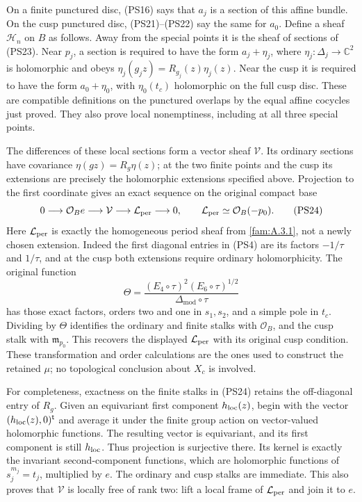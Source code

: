 On a finite punctured disc, (PS16) says that $a_j$ is a section of
this affine bundle. On the cusp punctured disc, (PS21)--(PS22) say
the same for $a_0$. Define a sheaf $\mathscr H_n$ on $B$ as follows.
Away from the special points it is the sheaf of sections of (PS23).
Near $p_j$, a section is required to have the form $a_j+\eta_j$,
where $\eta_j:\Delta_j\to\mathbb C^2$ is holomorphic and obeys
$\eta_j(g_jz)=R_{g_j}(z)\eta_j(z)$. Near the cusp it is required
to have the form $a_0+\eta_0$, with $\eta_0(t_c)$ holomorphic on
the full cusp disc. These are compatible definitions on the punctured
overlaps by the equal affine cocycles just proved. They also prove
local nonemptiness, including at all three special points.

The differences of these local sections form a vector sheaf
$\mathcal V$. Its ordinary sections have covariance $\eta(gz)=R_g\eta(z)$;
at the two finite points and the cusp its extensions are precisely
the holomorphic extensions specified above. Projection to the first
coordinate gives an exact sequence on the original compact base
\[
 0\longrightarrow\mathcal O_B e\longrightarrow\mathcal V
        \longrightarrow\mathcal L_{\rm per}\longrightarrow0,
                  \qquad \mathcal L_{\rm per}\simeq\mathcal O_B(-p_0).
 \tag{PS24}\label{pshift:eq:vector-sheaf}
\]
Here $\mathcal L_{\rm per}$ is exactly the homogeneous period sheaf from
\cref{fam:A.3.1}, not a newly chosen extension. Indeed
the first diagonal entries in (PS4) are its factors $-1/\tau$ and
$1/\tau$, and at the cusp both extensions require ordinary
holomorphicity. The original function
\[
 \Theta=\frac{(E_4\circ\tau)^2(E_6\circ\tau)^{1/2}}
                 {\Delta_{\mathrm{mod}}\circ\tau}
\]
has those exact factors, orders two and one in $s_1,s_2$, and a
simple pole in $t_c$. Dividing by $\Theta$ identifies the ordinary
and finite stalks with $\mathcal O_B$, and the cusp stalk with
$\mathfrak m_{p_0}$. This recovers the displayed $\mathcal L_{\rm per}$
with its original cusp condition. These transformation and order
calculations are the ones used to construct the retained $\mu$;
no topological conclusion about $X_c$ is involved.

For completeness, exactness on the finite stalks in (PS24) retains
the off-diagonal entry of $R_g$. Given an equivariant first component
$h_{\rm loc}(z)$, begin with the vector $(h_{\rm loc}(z),0)^{\mathsf t}$ and average it
under the finite group action on vector-valued holomorphic functions.
The resulting vector is equivariant, and its first component is
still $h_{\rm loc}$. Thus projection is surjective there. Its kernel is
exactly the invariant second-component functions, which are
holomorphic functions of $s_j^{m_j}=t_j$, multiplied by $e$.
The ordinary and cusp stalks are immediate. This also proves that
$\mathcal V$ is locally free of rank two: lift a local frame of
$\mathcal L_{\rm per}$ and join it to $e$.

